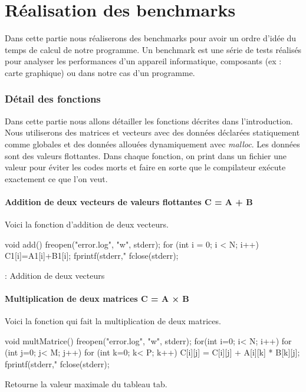 \documentclass{rapport}
\begin{document}
  \clearpage
  \part{Réalisation des benchmarks}\setcounter{section}{0}
  
    Dans cette partie nous réaliserons des benchmarks pour avoir un ordre d'idée du temps de calcul de notre programme.
    Un benchmark est une série de tests réalisés pour analyser les performances d'un appareil informatique, composants (ex : carte graphique) ou dans notre cas d'un programme.
    
    \section{Détail des fonctions}
      Dans cette partie nous allons détailler les fonctions décrites dans l'introduction. Nous utiliserons des matrices et vecteurs avec des données déclarées statiquement comme globales et des données allouées dynamiquement avec \textit{malloc}. Les données sont des valeurs flottantes. Dans chaque fonction, on print dans un fichier une valeur pour éviter les codes morts et faire en sorte que le compilateur exécute exactement ce que l'on veut.
      \subsection{Addition de deux vecteurs de valeurs flottantes C = A + B}
        Voici la fonction d'addition de deux vecteurs.
        \begin{algorithm}
        \begin{C}
void add() {
	freopen("error.log", "w", stderr);
    for (int i = 0; i < N; i++) {
        C1[i]=A1[i]+B1[i];
        fprintf(stderr,"%
    }
    fclose(stderr);
}
        \end{C}
        \caption[Algo en C]{: Addition de deux vecteurs\label{ag:algoc}}
        \end{algorithm}
        
      \subsection{Multiplication de deux matrices C = A × B}
        Voici la fonction qui fait la multiplication de deux matrices.
        \begin{algorithm}
        \begin{C}
void multMatrice(){
    freopen("error.log", "w", stderr);
    for(int i=0; i< N; i++){
        for (int j=0; j< M; j++){
            for (int k=0; k< P; k++){
                C[i][j] = C[i][j] + A[i][k] * B[k][j];
            }
            fprintf(stderr,"%
        }
    }
    fclose(stderr);
}
        \end{C}
        \caption[Algo en C]{Retourne la valeur maximale du tableau tab.\label{ag:algoc}}
        \end{algorithm}
\end{document}

